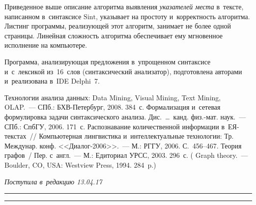 \begin{multicols}{2}
     Приведенное выше описание алгоритма выявления \textit{указателей 
места} в~тексте, написанном в~синтаксисе $\mathrm{Sint}$, указывает на прос\-то\-ту 
и~корректность ал\-го\-рит\-ма. Листинг программы, реализующей этот алгоритм, 
занимает не более одной страницы. Линейная слож\-ность алгоритма обеспечивает 
ему мгновенное исполнение на компь\-ютере.
{

}
     
     Программа, анализирующая предложения в~упрощенном синтаксисе 
и~с~лексикой из~16~слов (синтаксический анализатор), под\-го\-тов\-ле\-на авторами 
и~реализована в~IDE Delphi~7.
     
    {\small\frenchspacing
 {%
 \begin{thebibliography}{9}
 Технологии анализа 
данных: Data Mining, Visual Mining, Text Mining, OLAP.~--- СПб.: БХВ-Петербург, 2008. 384~с.
 Формализация и~сетевая формулировка задачи синтаксического анализа. 
Дис.\ \ldots\ канд. физ.-мат. наук.~--- СПб.: СпбГУ, 2006. 171~с.
 Распознавание количественной информации  
в~ЕЯ-текс\-тах~// Компьютерная лингвистика и~интеллектуальные технологии: Тр. Междунар. 
конф. <<Диалог-2006>>.~--- М.: РГГУ, 2006. С.~456--467.
 Теория графов~/ Пер. с~англ.~--- М.: Едиториал УРСС, 2003. 296~с.
( {Graph theory}.~--- Boulder, CO, USA: Westview Press, 1994. 284~p.)
 \end{thebibliography}

 }
 }

\end{multicols}

\vspace*{-6pt}

\hfill{\small\textit{Поступила в~редакцию 13.04.17}}

\vspace*{6pt}



\hrule

\vspace*{2pt}

\hrule



